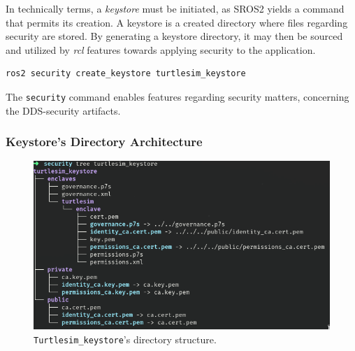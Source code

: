 
In technically terms, a \textit{keystore} must be initiated, as SROS2 yields a command that permits its creation. A keystore is a created directory where files regarding security are stored. By generating a keystore directory, it may then be sourced and utilized by \textit{rcl} features towards applying security to the application.
            
\begin{lstlisting}[title={\textit{Keystore} creation using the proper SROS2 command.}]
ros2 security create_keystore turtlesim_keystore
\end{lstlisting}

The \texttt{security} command enables features regarding security matters, concerning the DDS-security artifacts.

\subsubsection{Keystore's Directory Architecture}

\begin{figure}[H]
    \centering
    \includegraphics[width=0.7\linewidth]{images/ts_keystore_tree.png}
    \caption{\texttt{Turtlesim\_keystore}'s directory structure.}
    \label{fig:ts-keystore}
\end{figure}

